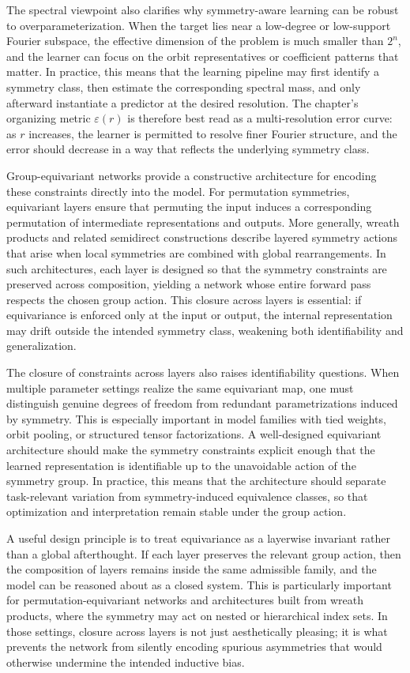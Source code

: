 \documentclass[11pt]{article}
\begin{document}
The spectral viewpoint also clarifies why symmetry-aware learning can be robust to overparameterization. When the target lies near a low-degree or low-support Fourier subspace, the effective dimension of the problem is much smaller than \(2^n\), and the learner can focus on the orbit representatives or coefficient patterns that matter. In practice, this means that the learning pipeline may first identify a symmetry class, then estimate the corresponding spectral mass, and only afterward instantiate a predictor at the desired resolution. The chapter's organizing metric \(\varepsilon(r)\) is therefore best read as a multi-resolution error curve: as \(r\) increases, the learner is permitted to resolve finer Fourier structure, and the error should decrease in a way that reflects the underlying symmetry class.

Group-equivariant networks provide a constructive architecture for encoding these constraints directly into the model. For permutation symmetries, equivariant layers ensure that permuting the input induces a corresponding permutation of intermediate representations and outputs. More generally, wreath products and related semidirect constructions describe layered symmetry actions that arise when local symmetries are combined with global rearrangements. In such architectures, each layer is designed so that the symmetry constraints are preserved across composition, yielding a network whose entire forward pass respects the chosen group action. This closure across layers is essential: if equivariance is enforced only at the input or output, the internal representation may drift outside the intended symmetry class, weakening both identifiability and generalization.

The closure of constraints across layers also raises identifiability questions. When multiple parameter settings realize the same equivariant map, one must distinguish genuine degrees of freedom from redundant parametrizations induced by symmetry. This is especially important in model families with tied weights, orbit pooling, or structured tensor factorizations. A well-designed equivariant architecture should make the symmetry constraints explicit enough that the learned representation is identifiable up to the unavoidable action of the symmetry group. In practice, this means that the architecture should separate task-relevant variation from symmetry-induced equivalence classes, so that optimization and interpretation remain stable under the group action.

A useful design principle is to treat equivariance as a layerwise invariant rather than a global afterthought. If each layer preserves the relevant group action, then the composition of layers remains inside the same admissible family, and the model can be reasoned about as a closed system. This is particularly important for permutation-equivariant networks and architectures built from wreath products, where the symmetry may act on nested or hierarchical index sets. In those settings, closure across layers is not just aesthetically pleasing; it is what prevents the network from silently encoding spurious asymmetries that would otherwise undermine the intended inductive bias.
\end{document}

